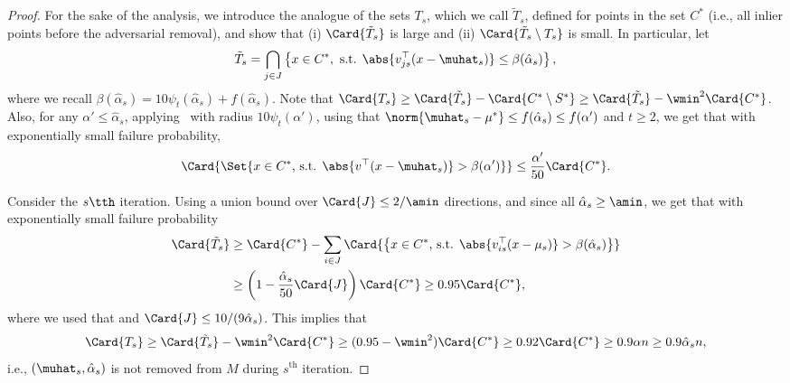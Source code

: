 \begin{proof}
For the sake of the analysis, we introduce the analogue of the sets \(T_s\), 
which we call \(\tilde T_s\), defined for points in the set \(C^{\ast}\) (i.e., all inlier points before the adversarial removal), and show that (i) \(\Card{\tilde T_s}\) is large 
and (ii) \(\Card{\tilde T_s \setminus T_s}\) is small.
In particular, let 
\[\tilde T_s =  \bigcap_{j \in J} \left\{x \in C^{\ast}, \text{ s.t. } \abs{v_{js}^{\top} (x - \muhat_s)} \leq \beta(\hat\alpha_s) \right\},\]
where we recall \(\beta(\hat\alpha_s) = 10 \psi_t(\hat\alpha_s) + f(\hat\alpha_s)\).
Note that \(\Card{T_s} \geq \Card{\tilde T_s} - \Card{C^{\ast} \setminus S^{\ast}} 
            \geq \Card{\tilde T_s} - \wmin^2\Card{C^{\ast}}\).
Also, for any \(\alpha' \leq \hat \alpha_s\), applying~ with radius \(10 \psi_t(\alpha')\), 
using that \(\norm{\muhat_s - \mu^{\ast}} \leq f(\hat\alpha_s) \leq f(\alpha')\) and \(t \geq 2\),
we get that with exponentially small failure probability,
\begin{equation}
    \label{eq:card_ub}
    \Card{\Set{x \in C^{\ast} \text{, s.t. } \abs{v^{\top}(x - \muhat_s)} > \beta(\alpha')}} \leq \frac{\alpha'}{50}\Card{C^{\ast}}.
\end{equation}

Consider the \(s\tth\) iteration.
Using a union bound over \(\Card{J} \leq 2 / \amin\) directions, and since all \(\hat \alpha_s \geq \amin\),
we get that with exponentially small failure probability
\begin{equation*}
    \begin{aligned}
    \Card{\tilde T_s} & \geq \Card{C^{\ast}} - \sum_{i \in J} \Card{\left\{x \in C^{\ast} \text{, s.t. } \abs{v_{is}^{\top} (x - \mu_s)} > \beta(\hat\alpha_s) \right\}} \\
    &\geq \left(1 - \frac{\hat\alpha_s}{50}\Card{J}\right) \Card{C^{\ast}} \geq 0.95 \Card{C^{\ast}},
    \end{aligned}
\end{equation*}
where we used that and \(\Card{J} \leq 10 / (9\hat\alpha_s)\).
This implies that 
\begin{equation*}
    \Card{T_s} \geq \Card{\tilde T_s} - \wmin^2 \Card{C^{\ast}} \geq (0.95 - \wmin^2) \Card{C^{\ast}} \geq 0.92\Card{C^{\ast}} \geq 0.9 \alpha n \geq 0.9\hat \alpha_s n,
\end{equation*}
i.e., \((\muhat_s, \hat\alpha_s)\) is not removed from \(M\) during \(s^{\mathrm{th}}\) iteration.



\end{proof}

